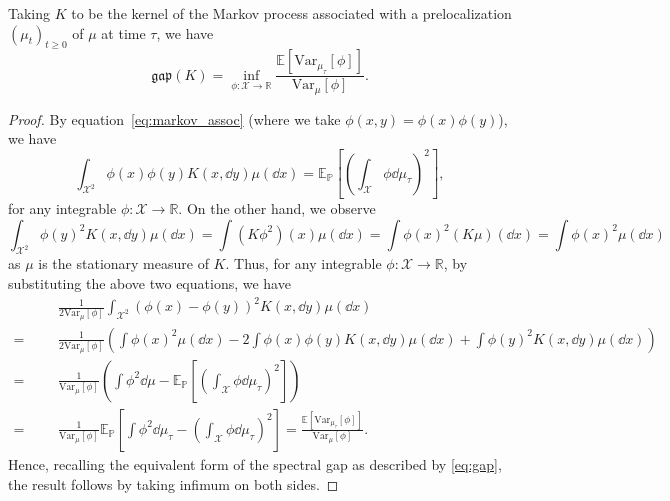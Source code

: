 \begin{proposition}\label{prop:gap_assoc}
  Taking \(K\) to be the kernel of the Markov process associated with a prelocalization \((\mu_t)_{t \ge 0}\)
  of \(\mu\) at time \(\tau\), we have 
  \[\mathfrak{gap}(K) = \inf_{\phi : \mathcal{X} \to \mathbb{R}} \frac{\mathbb{E}[\text{Var}_{\mu_\tau}[\phi]]}{\text{Var}_\mu[\phi]}.\]
\end{proposition}
\begin{proof}
  By equation~\eqref{eq:markov_assoc} (where we take \(\phi(x, y) = \phi(x)\phi(y)\)), we have 
  \begin{equation}
    \int_{\mathcal{X}^2} \phi(x)\phi(y) K(x, \dd y) \mu(\dd x) = \mathbb{E}_\mathbb{P}\left[\left(\int_\mathcal{X} \phi \dd\mu_\tau\right)^2\right],
  \end{equation}
  for any integrable \(\phi : \mathcal{X} \to \mathbb{R}\). On the other hand, we observe 
  \[\int_{\mathcal{X}^2} \phi(y)^2 K(x, \dd y) \mu(\dd x) = \int (K \phi^2)(x) \mu(\dd x) = 
      \int \phi(x)^2 (K\mu)(\dd x) = \int \phi(x)^2 \mu(\dd x)\]
  as \(\mu\) is the stationary measure of \(K\). Thus, for any integrable \(\phi : \mathcal{X} \to \mathbb{R}\),
  by substituting the above two equations, we have
  \begin{align*}
    \hspace{1cm} & \frac{1}{2\text{Var}_\mu[\phi]} \int_{\mathcal{X}^2}(\phi(x) - \phi(y))^2 K(x, \dd y) \mu(\dd x) \\
    = & \frac{1}{2\text{Var}_\mu[\phi]} \left(\int\phi(x)^2\mu(\dd x) 
      - 2\int \phi(x)\phi(y) K(x, \dd y) \mu(\dd x) + \int \phi(y)^2 K(x, \dd y) \mu(\dd x)\right) \\
    = & \frac{1}{\text{Var}_\mu[\phi]}\left(\int\phi^2 \dd \mu 
      - \mathbb{E}_\mathbb{P}\left[\left(\int_\mathcal{X} \phi \dd\mu_\tau\right)^2\right]\right) \\
    = & \frac{1}{\text{Var}_\mu[\phi]} 
        \mathbb{E}_\mathbb{P}\left[\int\phi^2 \dd \mu_\tau - \left(\int_\mathcal{X} \phi \dd\mu_\tau\right)^2\right]
      = \frac{\mathbb{E}[\text{Var}_{\mu_\tau}[\phi]]}{\text{Var}_\mu[\phi]}.
  \end{align*}
  Hence, recalling the equivalent form of the spectral gap as described by \eqref{eq:gap}, the result follows 
  by taking infimum on both sides.
\end{proof}


